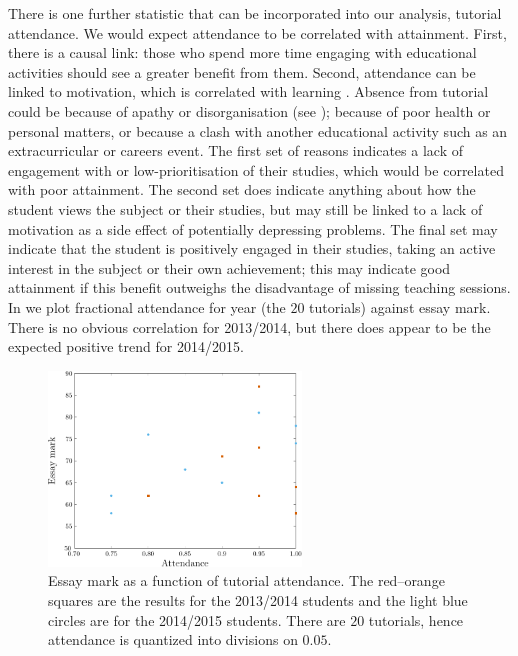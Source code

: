There is one further statistic that can be incorporated into our analysis, tutorial attendance. We would expect attendance to be correlated with attainment. First, there is a causal link: those who spend more time engaging with educational activities should see a greater benefit from them. Second, attendance can be linked to motivation, which is correlated with learning \citep[e.g.,][chapter 4]{Ramsden1992}. Absence from tutorial could be because of apathy or disorganisation (see ); because of poor health or personal matters, or because a clash with another educational activity such as an extracurricular or careers event. The first set of reasons indicates a lack of engagement with or low-prioritisation of their studies, which would be correlated with poor attainment. The second set does indicate anything about how the student views the subject or their studies, but may still be linked to a lack of motivation as a side effect of potentially depressing problems. The final set may indicate that the student is positively engaged in their studies, taking an active interest in the subject or their own achievement; this may indicate good attainment if this benefit outweighs the disadvantage of missing teaching sessions. In  we plot fractional attendance for year (the $20$ tutorials) against essay mark. There is no obvious correlation for 2013/2014, but there does appear to be the expected positive trend for 2014/2015.
\begin{figure}
  \centering
   \includegraphics[width=0.6\textwidth]{./figs/Fig_attend}
\caption{Essay mark as a function of tutorial attendance. The red--orange squares are the results for the 2013/2014 students and the light blue circles are for the 2014/2015 students. There are $20$ tutorials, hence attendance is quantized into divisions on $0.05$.}
  \label{fig:attend}
\end{figure}

